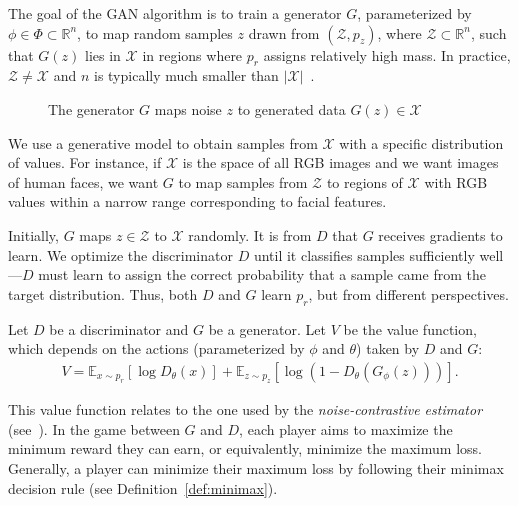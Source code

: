 The goal of the GAN algorithm is to train a generator $G$, parameterized by $\phi \in \Phi \subset \mathbb{R}^n$, to map random samples $z$ drawn from $(\mathcal{Z}, p_z)$, where $\mathcal{Z} \subset \mathbb{R}^n$, such that $G(z)$ lies in $\mathcal{X}$ in regions where $p_r$ assigns relatively high mass. In practice, $\mathcal{Z} \neq \mathcal{X}$ and $n$ is typically much smaller than $|\mathcal{X}|$~\cite{ref:arjovsky-2017}.

\begin{figure}[H]
	\centering
	\caption{The generator $G$ maps noise $z$ to generated data $G(z) \in \mathcal{X}$}%
	\label{fig:g-maps}
\end{figure}

We use a generative model to obtain samples from $\mathcal{X}$ with a specific distribution of values. For instance, if $\mathcal{X}$ is the space of all RGB images and we want images of human faces, we want $G$ to map samples from $\mathcal{Z}$ to regions of $\mathcal{X}$ with RGB values within a narrow range corresponding to facial features.

Initially, $G$ maps $z \in \mathcal{Z}$ to $\mathcal{X}$ randomly. It is from $D$ that $G$ receives gradients to learn. We optimize the discriminator $D$ until it classifies samples sufficiently well—$D$ must learn to assign the correct probability that a sample came from the target distribution. Thus, both $D$ and $G$ learn $p_r$, but from different perspectives.

Let $D$ be a discriminator and $G$ be a generator. Let $V$ be the value function, which depends on the actions (parameterized by $\phi$ and $\theta$) taken by $D$ and $G$:
\begin{align}
	\label{eq:the-original-objective-function}
	V = \mathbb{E}_{x \sim p_r}[\log D_\theta(x)] + \mathbb{E}_{z \sim p_z}[\log{(1 - D_\theta(G_\phi(z)))}].
\end{align}

This value function relates to the one used by the \textit{noise-contrastive estimator} (see~\cite{ref:gutmann-2010}). In the game between $G$ and $D$, each player aims to maximize the minimum reward they can earn, or equivalently, minimize the maximum loss. Generally, a player can minimize their maximum loss by following their minimax decision rule (see Definition~\ref{def:minimax}).

